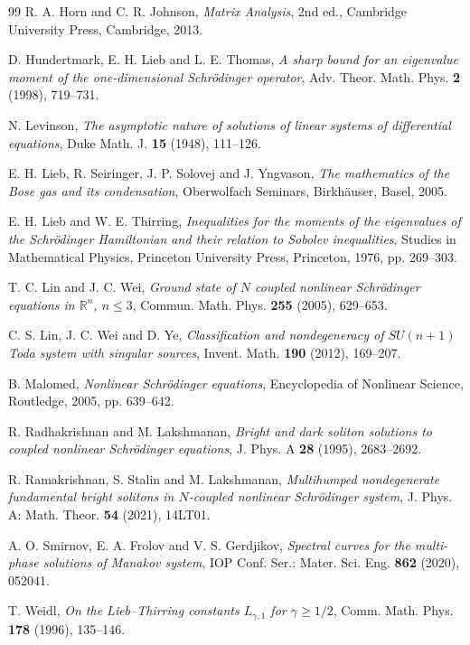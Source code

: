 \documentclass[11pt]{article}
\numberwithin{equation}{section}
\theoremstyle{definition}
\begin{document}
\begin{thebibliography}{99}
R. A. Horn and C. R. Johnson,
\emph{Matrix Analysis}, 2nd ed.,
Cambridge University Press, Cambridge, 2013.

D. Hundertmark, E. H. Lieb and L. E. Thomas,
\emph{A sharp bound for an eigenvalue moment of the one-dimensional Schr\"{o}dinger operator},
Adv. Theor. Math. Phys. \textbf{2} (1998), 719--731.

N. Levinson,
\emph{The asymptotic nature of solutions of linear systems of differential equations},
Duke Math. J. \textbf{15} (1948), 111--126.

E. H. Lieb, R. Seiringer, J. P. Solovej and J. Yngvason,
\emph{The mathematics of the Bose gas and its condensation},
Oberwolfach Seminars, Birkh\"auser, Basel, 2005.

E. H. Lieb and W. E. Thirring,
\emph{Inequalities for the moments of the eigenvalues of the Schr\"{o}dinger Hamiltonian and their relation to Sobolev inequalities},
Studies in Mathematical Physics, Princeton University Press,
Princeton, 1976, pp. 269--303.

T. C. Lin and J. C. Wei,
\emph{Ground state of $N$ coupled nonlinear Schr\"{o}dinger equations in $\mathbb R^n$, $n\leq 3$},
Commun. Math. Phys. \textbf{255} (2005), 629--653.

C. S. Lin, J. C. Wei and D. Ye,
\emph{Classification and nondegeneracy of $SU(n+1)$ Toda system with singular sources},
Invent. Math. \textbf{190} (2012), 169--207.

B. Malomed,
\emph{Nonlinear Schr\"{o}dinger equations},
Encyclopedia of Nonlinear Science,
Routledge, 2005, pp. 639--642.

R. Radhakrishnan and M. Lakshmanan,
\emph{Bright and dark soliton solutions to coupled nonlinear Schr\"{o}dinger equations},
J. Phys. A \textbf{28} (1995), 2683--2692.

R. Ramakrishnan, S. Stalin and M. Lakshmanan,
\emph{Multihumped nondegenerate fundamental bright solitons in $N$-coupled nonlinear Schr\"{o}dinger system},
J. Phys. A: Math. Theor. \textbf{54} (2021), 14LT01.

A. O. Smirnov, E. A. Frolov and V. S. Gerdjikov,
\emph{Spectral curves for the multi-phase solutions of Manakov system},
IOP Conf. Ser.: Mater. Sci. Eng. \textbf{862} (2020), 052041.

T. Weidl,
\emph{On the Lieb--Thirring constants $L_{\gamma,1}$ for $\gamma \geq 1/2$},
Comm. Math. Phys. \textbf{178} (1996), 135--146.


\end{thebibliography}
\end{document}
